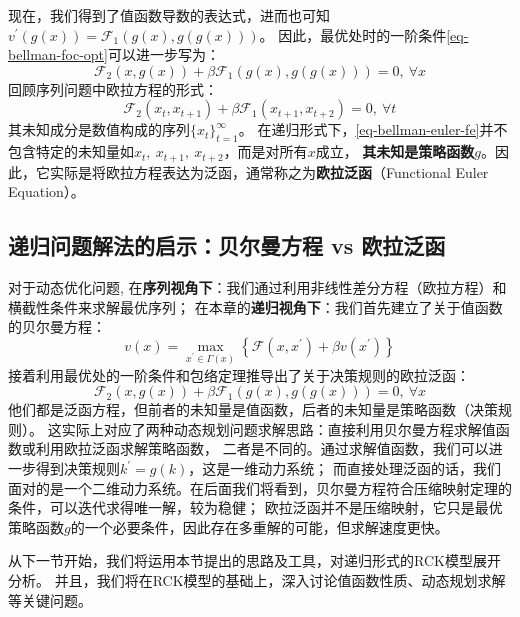 现在，我们得到了值函数导数的表达式，进而也可知
$v^{\prime}\left(g(x)\right)=\mathcal{F}_{1}\left(g\left(x\right),g\left(g\left(x\right)\right)\right)$。
因此，最优处时的一阶条件\cref{eq-bellman-foc-opt}可以进一步写为：
\begin{equation}    \label{eq-bellman-euler-fe}
    \mathcal{F}_2(x, g(x))+\beta \mathcal{F}_1(g(x), g(g(x)))=0, ~ \forall x 
\end{equation}
回顾序列问题中欧拉方程的形式：
\begin{equation*}
    \mathcal{F}_2\left(x_t, x_{t+1}\right)+\beta \mathcal{F}_1\left(x_{t+1}, x_{t+2}\right)=0, ~ \forall t
\end{equation*}
其未知成分是数值构成的序列$\{x_t\}_{t=1}^{\infty}$。
在递归形式下，\cref{eq-bellman-euler-fe}并不包含特定的未知量如$x_t,~x_{t+1},~x_{t+2}$，而是对所有$x$成立，
\textbf{其未知是策略函数}$g$。因此，它实际是将欧拉方程表达为泛函，通常称之为\textbf{欧拉泛函}（Functional Euler Equation）。


\subsection{递归问题解法的启示：贝尔曼方程 vs 欧拉泛函}

对于动态优化问题,
在\textbf{序列视角下}：我们通过利用非线性差分方程（欧拉方程）和横截性条件来求解最优序列；
在本章的\textbf{递归视角下}：我们首先建立了关于值函数的贝尔曼方程：
\begin{equation*}
    v(x) = \max _{x^{\prime} \in \Gamma(x)}
        \left\{\mathcal{F}\left(x, x^{\prime}\right)+\beta v\left(x^{\prime}\right)\right\}
\end{equation*}
接着利用最优处的一阶条件和包络定理推导出了关于决策规则的欧拉泛函：
\begin{equation*}
    \mathcal{F}_2(x, g(x))+\beta \mathcal{F}_1(g(x), g(g(x)))=0, ~ \forall x
\end{equation*}
他们都是泛函方程，但前者的未知量是值函数，后者的未知量是策略函数（决策规则）。
这实际上对应了两种动态规划问题求解思路：直接利用贝尔曼方程求解值函数或利用欧拉泛函求解策略函数，
二者是不同的。通过求解值函数，我们可以进一步得到决策规则$k^{\prime} = g(k)$，这是一维动力系统；
而直接处理泛函的话，我们面对的是一个二维动力系统。在后面我们将看到，贝尔曼方程符合压缩映射定理的条件，可以迭代求得唯一解，较为稳健；
欧拉泛函并不是压缩映射，它只是最优策略函数$g$的一个必要条件，因此存在多重解的可能，但求解速度更快。

从下一节开始，我们将运用本节提出的思路及工具，对递归形式的RCK模型展开分析。
并且，我们将在RCK模型的基础上，深入讨论值函数性质、动态规划求解等关键问题。